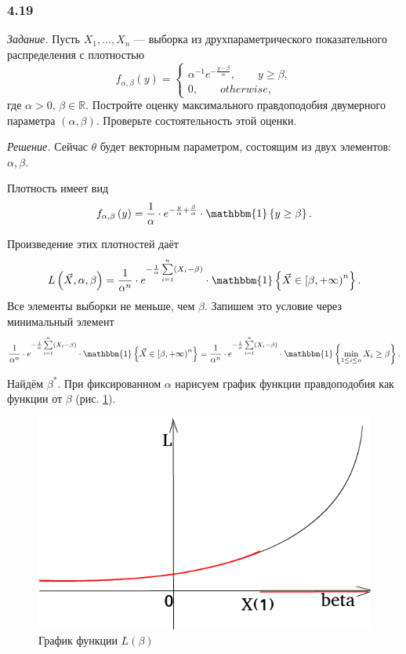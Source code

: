 \subsubsection*{4.19}

\textit{Задание.}
Пусть $X_1, \dotsc, X_n$ ---
выборка из друхпараметрического показательного распределения с плотностью
$$f_{ \alpha, \beta } \left( y \right) =
  \begin{cases}
    \alpha^{-1} e^{- \frac{y - \beta }{ \alpha }}, \qquad y \geq \beta, \\
    0, \qquad otherwise,
  \end{cases}$$
где $ \alpha > 0, \, \beta \in \mathbb{R}$.
Постройте оценку максимального правдоподобия двумерного параметра $ \left( \alpha, \beta \right) $.
Проверьте состоятельность этой оценки.

\textit{Решение.}
Сейчас $ \theta $ будет векторным параметром, состоящим из двух элементов: $ \alpha, \beta $.

Плотность имеет вид
$$f_{ \alpha, \beta } \left( y \right) =
  \frac{1}{ \alpha } \cdot
  e^{- \frac{y}{ \alpha } + \frac{ \beta }{ \alpha }} \cdot
  \mathbbm{1} \left\{ y \geq \beta \right\}.$$

Произведение этих плотностей даёт
$$L \left( \vec{X}, \alpha, \beta \right) =
  \frac{1}{ \alpha^n} \cdot
  e^{- \frac{1}{ \alpha } \sum \limits_{i = 1}^n \left( X_i - \beta \right) } \cdot
  \mathbbm{1} \left\{ \vec{X} \in \left[ \beta, + \infty \right)^n \right\}.$$
Все элементы выборки не меньше, чем $ \beta $.
Запишем это условие через минимальный элемент
$$ \frac{1}{ \alpha^n} \cdot
  e^{- \frac{1}{ \alpha } \sum \limits_{i = 1}^n \left( X_i - \beta \right) } \cdot
  \mathbbm{1} \left\{ \vec{X} \in \left[ \beta, + \infty \right)^n \right\} =
  \frac{1}{ \alpha^n} \cdot
  e^{- \frac{1}{ \alpha } \sum \limits_{i = 1}^n \left( X_i - \beta \right) }
  \cdot \mathbbm{1} \left\{ \min \limits_{1 \leq i \leq n} X_i \geq \beta \right\}.$$

Найдём $ \beta^*$.
При фиксированном $ \alpha $ нарисуем график функции правдоподобия как функции от $ \beta $
(рис. \ref{fig:419}).

\begin{figure}[h!]
  \centering
  \includegraphics[width=.4\textwidth]{./pictures/4_19.png}
  \caption{График функции $L \left( \beta \right) $}
  \label{fig:419}
\end{figure}

